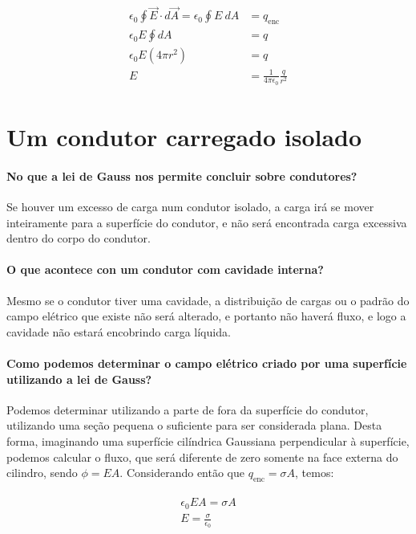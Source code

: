   \begin{gather}
    \begin{align}
      \epsilon_0 \oint \vec{E} \cdot d \vec{A} = \epsilon_0 \oint E \ dA &= q_{\text{enc}}\\ 
      \epsilon_0 E \oint dA &= q \\
      \epsilon_0 E (4 \pi r^2) &= q \\
      E &= \frac{1}{4 \pi \epsilon_0} \frac{q}{r^2}
    \end{align}
  \end{gather}

\section*{Um condutor carregado isolado}
  
  \paragraph{No que a lei de Gauss nos permite concluir sobre condutores?} Se houver um excesso de carga num condutor isolado, a carga irá se mover inteiramente para a superfície do condutor, e não será encontrada carga excessiva dentro do corpo do condutor.

  \paragraph{O que acontece con um condutor com cavidade interna?} Mesmo se o condutor tiver uma cavidade, a distribuição de cargas ou o padrão do campo elétrico que existe não será alterado, e portanto não haverá fluxo, e logo a cavidade não estará encobrindo carga líquida.

  \paragraph{Como podemos determinar o campo elétrico criado por uma superfície utilizando a lei de Gauss?} Podemos determinar utilizando a parte de fora da superfície do condutor, utilizando uma seção pequena o suficiente para ser considerada plana. Desta forma, imaginando uma superfície cilíndrica Gaussiana perpendicular à superfície, podemos calcular o fluxo, que será diferente de zero somente na face externa do cilindro, sendo $ \phi = EA $. Considerando então que $ q_{\text{enc}} = \sigma A $, temos:

  \begin{gather}
    \begin{align}
      \epsilon_0 E A  = \sigma A \\
      E = \frac{\sigma}{\epsilon_0}
    \end{align}
  \end{gather}

